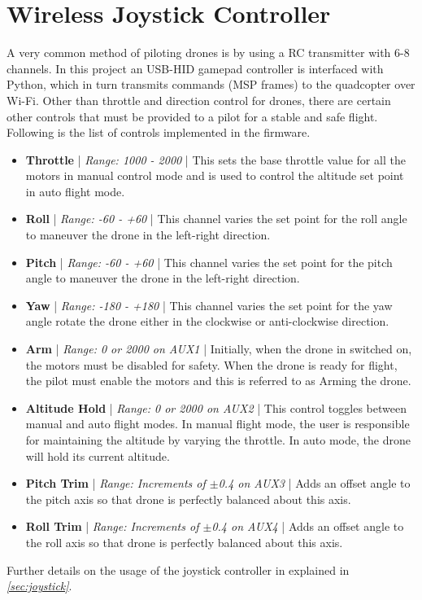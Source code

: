 \documentclass[a4paper,12pt,oneside]{book}
\begin{document}
\bigskip

\section{Wireless Joystick Controller}
\label{sec:wjc}
A very common method of piloting drones is by using a RC transmitter with 6-8 channels. In this project an USB-HID gamepad controller is interfaced with Python, which in turn transmits commands (MSP frames) to the quadcopter over Wi-Fi. Other than throttle and direction control for drones, there are certain other controls that must be provided to a pilot for a stable and safe flight. Following is the list of controls implemented in the firmware.\\

\begin{itemize}
\item \textbf{Throttle} | \textit{Range: 1000 - 2000} | This sets the base throttle value for all the motors in manual control mode and is used to control the altitude set point in auto flight mode.

\item \textbf{Roll} | \textit{Range: -60 - +60} | This channel varies the set point for the roll angle to maneuver the drone in the left-right direction.

\item \textbf{Pitch} | \textit{Range: -60 - +60} | This channel varies the set point for the pitch angle to maneuver the drone in the left-right direction.

\item \textbf{Yaw} | \textit{Range: -180 - +180} | This channel varies the set point for the yaw angle rotate the drone either in the clockwise or anti-clockwise direction.

\item \textbf{Arm} | \textit{Range: 0 or 2000 on AUX1} | Initially, when the drone in switched on, the motors must be disabled for safety. When the drone is ready for flight, the pilot must enable the motors and this is referred to as Arming the drone.

\item \textbf{Altitude Hold} | \textit{Range: 0 or 2000 on AUX2} | This control toggles between manual and auto flight modes. In manual flight mode, the user is responsible for maintaining the altitude by varying the throttle. In auto mode, the drone will hold its current altitude.

\item \textbf{Pitch Trim} | \textit{Range: Increments of $\pm$0.4 on AUX3} | Adds an offset angle to the pitch axis so that drone is perfectly balanced about this axis.

\item \textbf{Roll Trim} | \textit{Range: Increments of $\pm$0.4 on AUX4} | Adds an offset angle to the roll axis so that drone is perfectly balanced about this axis.\\
\end{itemize}
Further details on the usage of the joystick controller in explained in \textit{\autoref{sec:joystick}}.
\end{document}
